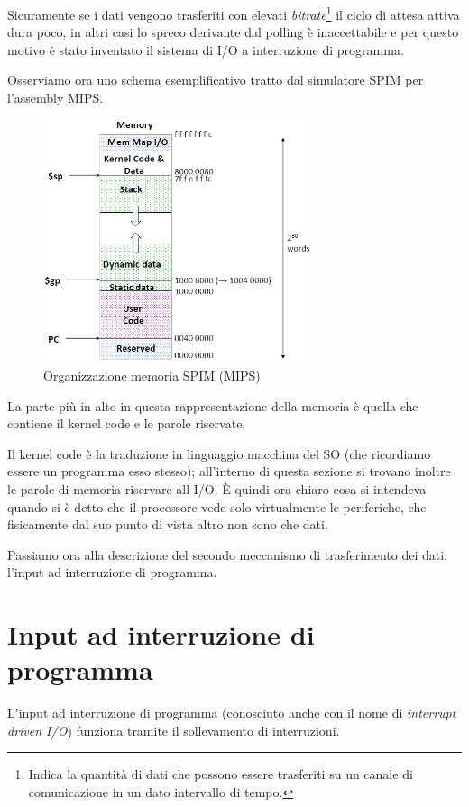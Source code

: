 \documentclass[class=book, crop=false, oneside]{standalone}
\begin{document}
Sicuramente se i dati vengono trasferiti con elevati \emph{bitrate}\footnote{Indica la quantità di dati che possono essere trasferiti su un canale di comunicazione in un dato intervallo di tempo.} il ciclo di attesa attiva dura poco, in altri casi lo spreco derivante dal polling è inaccettabile e per questo motivo è stato inventato il sistema di I/O a interruzione di programma.

Osserviamo ora uno schema esemplificativo tratto dal simulatore SPIM per l'assembly MIPS.
\begin{figure}[H]
	\centering
	\includegraphics[width=0.7\textwidth,keepaspectratio]{SPIM}
	\caption{Organizzazione memoria SPIM (MIPS)}
\end{figure}
La parte più in alto in questa rappresentazione della memoria è quella che contiene il kernel code e le parole riservate.

Il kernel code è la traduzione in linguaggio macchina del SO (che ricordiamo essere un programma esso stesso); all'interno di questa sezione si trovano inoltre le parole di memoria riservare all I/O. È quindi ora chiaro cosa si intendeva quando si è detto che il processore vede solo virtualmente le periferiche, che fisicamente dal suo punto di vista altro non sono che dati.

Passiamo ora alla descrizione del secondo meccanismo di trasferimento dei dati: l'input ad interruzione di programma.

\section{Input ad interruzione di programma}
L'input ad interruzione di programma (conosciuto anche con il nome di \emph{interrupt driven I/O}) funziona tramite il sollevamento di interruzioni.
\end{document}
